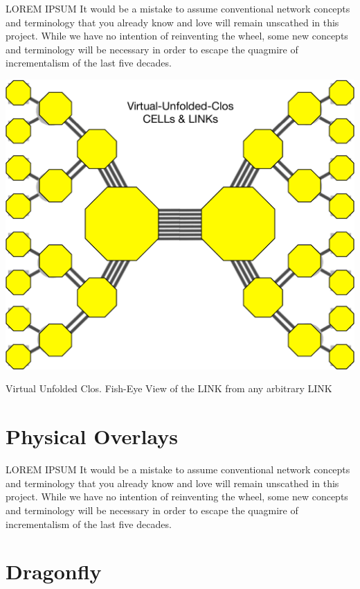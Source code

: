 LOREM IPSUM It would be a mistake to assume conventional network concepts and terminology that you already know and love will remain unscathed in this project. While we have no intention of reinventing the wheel,  some new concepts and terminology will be necessary in order to escape the quagmire of incrementalism of the last five decades.  

 \begin{marginfigure}
  \includegraphics[width=1.2\linewidth]{../../FIGURES/Virtual-Unfolded-Clos.pdf}
   \caption{Virtual Unfolded Clos. Fish-Eye View of the LINK from any arbitrary LINK}
      \vspace{2em}
\end{marginfigure}


\section{Physical Overlays}

LOREM IPSUM It would be a mistake to assume conventional network concepts and terminology that you already know and love will remain unscathed in this project. While we have no intention of reinventing the wheel,  some new concepts and terminology will be necessary in order to escape the quagmire of incrementalism of the last five decades.  

\section{Dragonfly}

